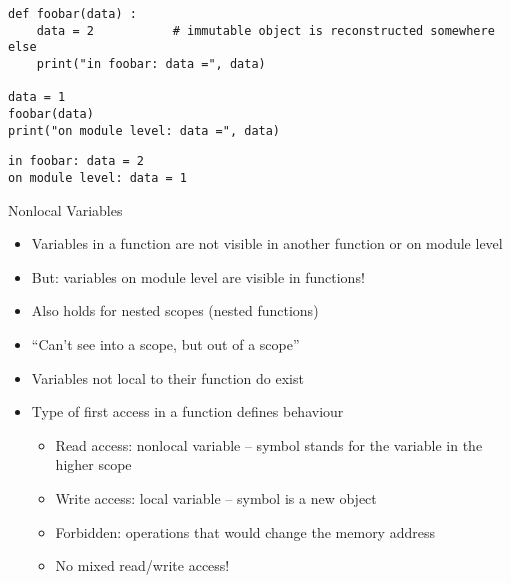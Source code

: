 
\begin{frame}[fragile]
%
\begin{codebox}
\begin{verbatim}
def foobar(data) :
    data = 2           # immutable object is reconstructed somewhere else
    print("in foobar: data =", data)

data = 1
foobar(data)
print("on module level: data =", data)
\end{verbatim}
\end{codebox}

\begin{cmdbox}
\begin{verbatim}
in foobar: data = 2
on module level: data = 1
\end{verbatim}
\end{cmdbox}
%
\end{frame}


\begin{frame}{Nonlocal Variables}
%
\begin{itemize}
\item Variables in a function are not visible in another function or on module level
\item But: variables on module level are visible in functions!
\item Also holds for nested scopes (nested functions)
\item \enquote{Can't see into a scope, but out of a scope}
\item[\Thus] Variables not local to their function do exist
\item Type of first access in a function defines behaviour
	\begin{itemize}
	\item Read access: nonlocal variable -- symbol stands for the variable in the higher scope
	\item Write access: local variable -- symbol is a new object
	\item Forbidden: operations that would change the memory address
	\item[\Thus] No mixed read/write access!
	\end{itemize}
\end{itemize}
%
\end{frame}

